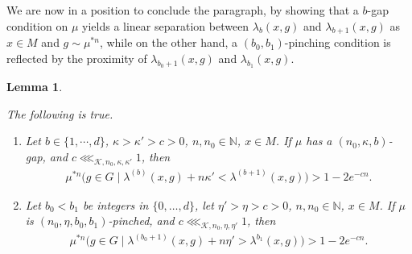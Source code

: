 \documentclass[11pt, leqno, fleqn]{amsart}
\def\eps{\varepsilon}
\newcommand{\margem}[1]{\marginpar{{\scriptsize {#1}}}}
\def\clo{   \color{orange}}
\def \N{{\mathbb N}}
\newcommand{\cK}{{\mathcal K}}
\newcommand{\aryst}{\begin{eqnarray*}}
\newcommand{\earyst}{\end{eqnarray*}}
\newcommand{\enmt}{\begin{enumerate}}
\newcommand{\eenmt}{\end{enumerate}}
\newtheorem{lemma}[thm]{\bf Lemma}
\theoremstyle{definition}
\theoremstyle{definition}
\begin{document}
	We are now in a position to conclude the paragraph, by showing that a $b$-gap condition on $\mu$ yields a linear separation between $\lambda_{b}(x,g)$ and  $\lambda_{b+1}(x,g)$ as $x\in M$ and $g\sim \mu^{*n}$, while  on the other hand, a $(b_{0},b_{1})$-pinching condition is reflected by the proximity of  $\lambda_{b_{0}+1}(x,g)$ and $\lambda_{b_{1}}(x,g)$. 
	
		
\begin{lemma} \label{cor GapWithHighProba}  %
			
			
			 The following is true.
			 
			 \enmt
			 \item
			 Let  $b\in  \{1, \cdots, d\}$, $\kappa >\kappa'> c > 0$, $n, n_{0}\in \N$, $x\in M$. If  $\mu$ has a $(n_{0}, \kappa, b)$-gap,   
			and  $c \lll_{\cK, n_{0}, \kappa, \kappa'} 1$, then
		   \aryst 
		   \mu^{*n} \Big (  g \in G \mid    \lambda^{(b)}(x, g)  + n \kappa'  <   \lambda^{(b + 1)}(x, g)    \Big  ) > 1 - 2e^{- c n }.
		   \earyst
		   \item
		  Let  $ b_{0}<b_{1}$ be integers in $\{0, \dots, d\}$, let $\eta'>\eta> c > 0$, $n, n_{0} \in \N$, $x\in M$.  
		   If $\mu$ is $(n_{0}, \eta, b_{0}, b_{1})$-pinched,  and $c \lll_{\cK, n_{0}, \eta, \eta'} 1$, then 		   		   \aryst 
		   \mu^{*n} \Big (  g \in G  \mid     
	   \lambda^{(b_{0} + 1)}(x, g) +   n \eta'   >  \lambda^{b_{1}}(x, g) \Big  ) > 1 - 2e^{-c n }.
		   \earyst
		   \eenmt
		\end{lemma}
		
\end{document}
